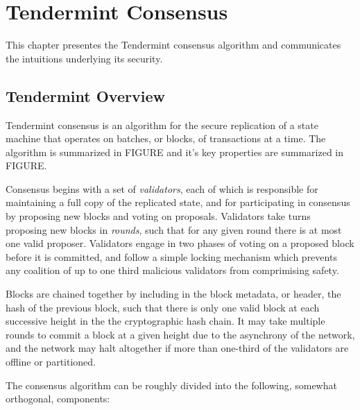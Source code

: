 \chapter{Tendermint Consensus}

This chapter presentes the Tendermint consensus algorithm and communicates the intuitions underlying its security.

\section{Tendermint Overview}

Tendermint consensus is an algorithm for the secure replication of a state machine that operates on batches, or blocks, of transactions at a time.
The algorithm is summarized in FIGURE and it's key properties are summarized in FIGURE. 

Consensus begins with a set of \emph{validators}, each of which is responsible for maintaining a full copy of the replicated state,
and for participating in consensus by proposing new blocks and voting on proposals.
Validators take turns proposing new blocks in \emph{rounds}, such that for any given round there is at most one valid proposer.
Validators engage in two phases of voting on a proposed block before it is committed, 
and follow a simple locking mechanism which prevents any coalition of up to one third malicious validators from comprimising safety.

Blocks are chained together by including in the block metadata, or header, the hash of the previous block,
such that there is only one valid block at each successive height in the the cryptographic hash chain.
It may take multiple rounds to commit a block at a given height due to the asynchrony of the network,
and the network may halt altogether if more than one-third of the validators are offline or partitioned.

The consensus algorithm can be roughly divided into the following, somewhat orthogonal, components:

